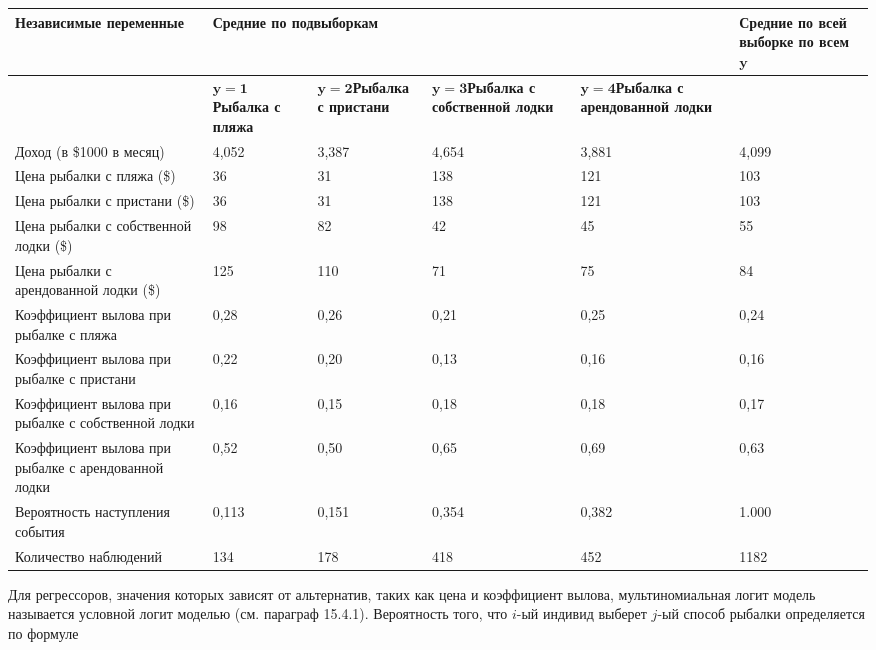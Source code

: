 \begin{tabular}{|p{1.3in}|p{0.5in}|p{0.5in}|p{0.7in}|p{0.8in}|p{0.7in}|} \hline 
\textbf{Независимые переменные} & \multicolumn{4}{|p{2.5in}|}{\textbf{Средние по подвыборкам}} & \textbf{Средние по всей выборке по всем }${\mathbf y}$\textbf{} \\ \hline 
 & ${\mathbf y}{\mathbf =}{\mathbf 1}$\textbf{\newline Рыбалка с пляжа} & ${\mathbf y}{\mathbf =}{\mathbf 2}$\textbf{\newline Рыбалка с пристани} & ${\mathbf y}{\mathbf =}{\mathbf 3}$\textbf{\newline Рыбалка с собственной лодки} & ${\mathbf y}{\mathbf =}{\mathbf 4}$\textbf{\newline Рыбалка с арендованной лодки} & \textbf{} \\ \hline 
Доход (в \$1000 в месяц) & 4,052 & 3,387 & 4,654 & 3,881 & 4,099 \\ \hline 
Цена рыбалки с пляжа (\$) & 36 & 31 & 138 & 121 & 103 \\ \hline 
Цена рыбалки с пристани (\$) & 36 & 31 & 138 & 121 & 103 \\ \hline 
Цена рыбалки с собственной лодки (\$) & 98 & 82 & 42 & 45 & 55 \\ \hline 
Цена рыбалки с арендованной лодки (\$) & 125 & 110 & 71 & 75 & 84 \\ \hline 
Коэффициент вылова при рыбалке с пляжа & 0,28 & 0,26 & 0,21 & 0,25 & 0,24 \\ \hline 
Коэффициент вылова при рыбалке с пристани & 0,22 & 0,20 & 0,13 & 0,16 & 0,16 \\ \hline 
Коэффициент вылова при рыбалке с собственной лодки & 0,16 & 0,15 & 0,18 & 0,18 & 0,17 \\ \hline 
Коэффициент вылова при рыбалке с арендованной лодки & 0,52 & 0,50 & 0,65 & 0,69 & 0,63 \\ \hline 
Вероятность наступления события & 0,113 & 0,151 & 0,354 & 0,382 & 1.000 \\ \hline 
Количество наблюдений & 134 & 178 & 418 & 452 & 1182 \\ \hline 
\end{tabular}



Для регрессоров, значения которых зависят от альтернатив, таких как цена и коэффициент вылова, мультиномиальная логит модель называется условной логит моделью (см. параграф 15.4.1). Вероятность того, что $i$-ый индивид выберет $j$-ый способ рыбалки определяется по формуле

